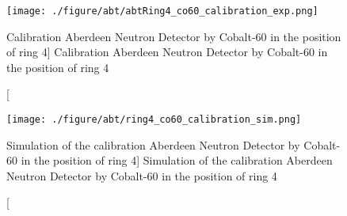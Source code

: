 \begin{figure}
    \centering
    \texttt{[image: ./figure/abt/abtRing4\_co60\_calibration\_exp.png]}
    \caption
    [Calibration Aberdeen Neutron Detector by Cobalt-60 in the position of ring 4]
    {Calibration Aberdeen Neutron Detector by Cobalt-60 in the position of ring 4}
    \label{fig:abtRing4_co60_calibration_exp.png}
    \end{figure}



\begin{figure}
    \centering
    \texttt{[image: ./figure/abt/ring4\_co60\_calibration\_sim.png]}
    \caption
    [Simulation of the calibration Aberdeen Neutron Detector by Cobalt-60 in the position of ring 4]
    {Simulation of the calibration Aberdeen Neutron Detector by Cobalt-60 in the position of ring 4}
    \label{fig:ring4_co60_calibration_sim.png}
    \end{figure}
